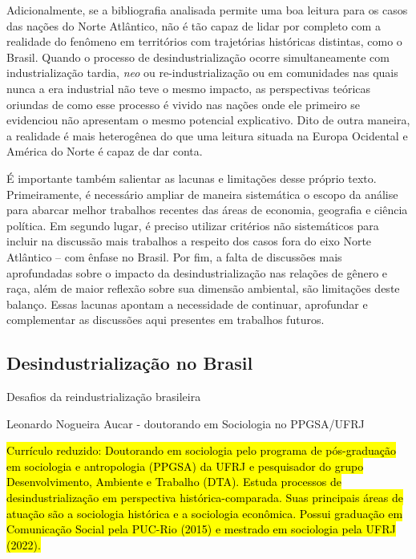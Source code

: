 Adicionalmente, se a bibliografia analisada permite uma boa leitura para
os casos das nações do Norte Atlântico, não é tão capaz de lidar por
completo com a realidade do fenômeno em territórios com trajetórias
históricas distintas, como o Brasil. Quando o processo de
desindustrialização ocorre simultaneamente com industrialização tardia,
\emph{neo} ou re-industrialização ou em comunidades nas quais nunca a
era industrial não teve o mesmo impacto, as perspectivas teóricas
oriundas de como esse processo é vivido nas nações onde ele primeiro se
evidenciou não apresentam o mesmo potencial explicativo. Dito de outra
maneira, a realidade é mais heterogênea do que uma leitura situada na
Europa Ocidental e América do Norte é capaz de dar conta.

É importante também salientar as lacunas e limitações desse próprio
texto. Primeiramente, é necessário ampliar de maneira sistemática o
escopo da análise para abarcar melhor trabalhos recentes das áreas de
economia, geografia e ciência política. Em segundo lugar, é preciso
utilizar critérios não sistemáticos para incluir na discussão mais
trabalhos a respeito dos casos fora do eixo Norte Atlântico -- com
ênfase no Brasil. Por fim, a falta de discussões mais aprofundadas sobre
o impacto da desindustrialização nas relações de gênero e raça, além de
maior reflexão sobre sua dimensão ambiental, são limitações deste
balanço. Essas lacunas apontam a necessidade de continuar, aprofundar e
complementar as discussões aqui presentes em trabalhos futuros.

\subsection{Desindustrialização no
Brasil}\label{desindustrializauxe7uxe3o-no-brasil}

Desafios da reindustrialização brasileira

Leonardo Nogueira Aucar - doutorando em Sociologia no PPGSA/UFRJ

\hl{Currículo reduzido: Doutorando em sociologia pelo programa de
pós-graduação em sociologia e antropologia (PPGSA) da UFRJ e pesquisador
do grupo Desenvolvimento, Ambiente e Trabalho (DTA). Estuda processos de
desindustrialização em perspectiva histórica-comparada. Suas principais
áreas de atuação são a sociologia histórica e a sociologia econômica.
Possui graduação em Comunicação Social pela PUC-Rio (2015) e mestrado em
sociologia pela UFRJ (2022).}

